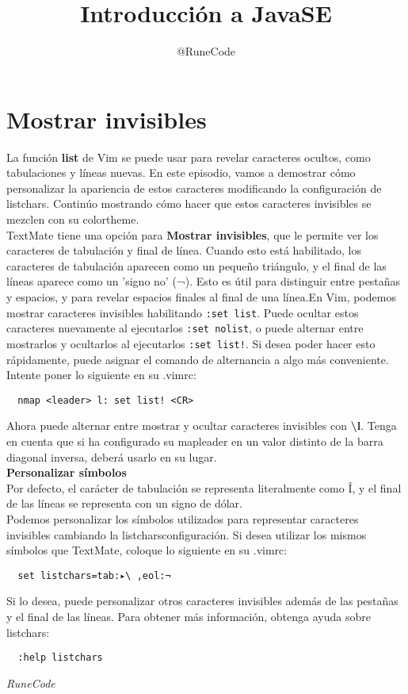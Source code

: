 \documentclass{article}
\title{Introducción a JavaSE}
\author{@RuneCode}
\begin{document}


\section{Mostrar invisibles}%
La función \textbf{list} de Vim se puede usar para revelar caracteres ocultos,
como tabulaciones y líneas nuevas. En este episodio, vamos a demostrar cómo
personalizar la apariencia de estos caracteres modificando la configuración de
listchars. Continúo mostrando cómo hacer que estos caracteres invisibles se
mezclen con su colortheme.\\

TextMate tiene una opción para \textbf{Mostrar invisibles}, que le permite ver
los caracteres de tabulación y final de línea. Cuando esto está habilitado, los
caracteres de tabulación aparecen como un pequeño triángulo, y el final de las
líneas aparece como un 'signo no' (¬). Esto es útil para distinguir entre
pestañas y espacios, y para revelar espacios finales al final de una línea.En
Vim, podemos mostrar caracteres invisibles habilitando \texttt{:set list}.
Puede ocultar estos caracteres nuevamente al ejecutarlos \texttt{:set nolist},
o puede alternar entre mostrarlos y ocultarlos al ejecutarlos  \texttt{:set
list!}. Si desea poder hacer esto rápidamente, puede asignar el comando de
alternancia a algo más conveniente.  Intente poner lo siguiente en su .vimrc:

\begin{verbatim}
  nmap <leader> l: set list! <CR>
\end{verbatim}

Ahora puede alternar entre mostrar y ocultar caracteres invisibles con
\textbf{{\textbackslash}l}. Tenga en cuenta que si ha configurado su mapleader
en un valor distinto de la barra diagonal inversa, deberá usarlo en su lugar.\\

\textbf{Personalizar símbolos}\\
Por defecto, el carácter de tabulación se representa literalmente como \^ I, y
el final de las líneas se representa con un signo de dólar.\\

Podemos personalizar los símbolos utilizados para representar caracteres
invisibles cambiando la listcharsconfiguración. Si desea utilizar los mismos
símbolos que TextMate, coloque lo siguiente en su .vimrc:

\begin{verbatim}
  set listchars=tab:▸\ ,eol:¬
\end{verbatim}

Si lo desea, puede personalizar otros caracteres invisibles además de las
pestañas y el final de las líneas. Para obtener más información, obtenga ayuda
sobre listchars:

\begin{verbatim}
  :help listchars
\end{verbatim}











\vspace{2cm}
\LARGE\textit{RuneCode}
\end{document}
